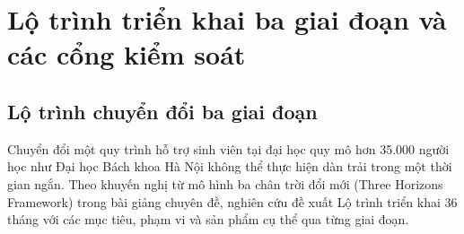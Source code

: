\section{Lộ trình triển khai ba giai đoạn và các cổng kiểm soát}

\subsection{Lộ trình chuyển đổi ba giai đoạn}
Chuyển đổi một quy trình hỗ trợ sinh viên tại đại học quy mô hơn 35.000 người học như Đại học Bách khoa Hà Nội không thể thực hiện dàn trải trong một thời gian ngắn. Theo khuyến nghị từ mô hình ba chân trời đổi mới (Three Horizons Framework) trong bài giảng chuyên đề, nghiên cứu đề xuất Lộ trình triển khai 36 tháng với các mục tiêu, phạm vi và sản phẩm cụ thể qua từng giai đoạn.

